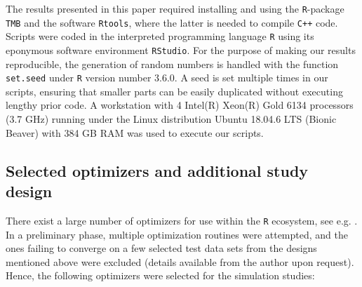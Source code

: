 \documentclass[]{interact}\usepackage[]{graphicx}\usepackage[dvipsnames]{xcolor}
\theoremstyle{plain}%
\theoremstyle{definition}
\theoremstyle{remark}
\newcommand{\hl}[1]{\color{red} \bf{#1}} %
\begin{document}
The results presented in this paper required installing and using the {\tt{R}}-package {\tt{TMB}} and the software {\tt{Rtools}}, where the latter is needed to compile {\tt{C++}} code.
Scripts were coded in the interpreted programming language {\tt{R}} \citep{rcoreteam} using its eponymous software environment {\tt{RStudio}}.
For the purpose of making our results reproducible, the generation of random numbers is handled with the function \texttt{set.seed} under {\tt{R}} version number 3.6.0.
A seed is set multiple times in our scripts, ensuring that smaller parts can be easily duplicated without executing lengthy prior code.
A workstation with 4 Intel(R) Xeon(R) Gold 6134 processors (3.7 GHz) running under the Linux distribution Ubuntu 18.04.6 LTS (Bionic Beaver) with 384 GB RAM was used to execute our scripts. 

\subsection{Selected optimizers and additional study design}
\label{sec:design}



There exist a large number of optimizers for use within the {\tt{R}} ecosystem, see e.g. \cite{schwendinger}.
In a preliminary phase, multiple optimization routines were attempted, and the ones failing to converge on a few selected test data sets from the designs mentioned above were excluded (details available from the author upon request).
Hence, the following optimizers were selected for the simulation studies:
\end{document}
